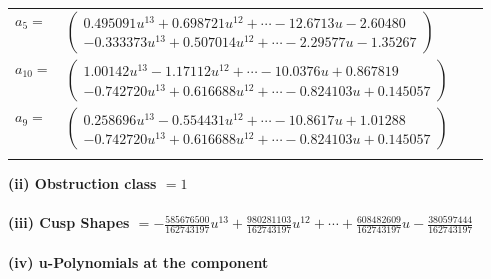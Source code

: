 \documentclass[1p]{elsarticle_modified}
\theoremstyle{definition}
\begin{document}
\begin{tabular}{m{7pt} m{180pt} m{7pt} m{180pt} }
\flushright $a_{5}=$&$\begin{pmatrix}0.495091 u^{13}+0.698721 u^{12}+\cdots-12.6713 u-2.60480\\-0.333373 u^{13}+0.507014 u^{12}+\cdots-2.29577 u-1.35267\end{pmatrix}$ \\
\flushright $a_{10}=$&$\begin{pmatrix}1.00142 u^{13}-1.17112 u^{12}+\cdots-10.0376 u+0.867819\\-0.742720 u^{13}+0.616688 u^{12}+\cdots-0.824103 u+0.145057\end{pmatrix}$ \\
\flushright $a_{9}=$&$\begin{pmatrix}0.258696 u^{13}-0.554431 u^{12}+\cdots-10.8617 u+1.01288\\-0.742720 u^{13}+0.616688 u^{12}+\cdots-0.824103 u+0.145057\end{pmatrix}$\\&\end{tabular}
\flushleft \textbf{(ii) Obstruction class $= 1$}\\~\\
\flushleft \textbf{(iii) Cusp Shapes $= -\frac{585676500}{162743197} u^{13}+\frac{980281103}{162743197} u^{12}+\cdots+\frac{608482609}{162743197} u-\frac{380597444}{162743197}$}\\~\\
\newpage\renewcommand{\arraystretch}{1}
\flushleft \textbf{(iv) u-Polynomials at the component}\newline \\
\end{document}
